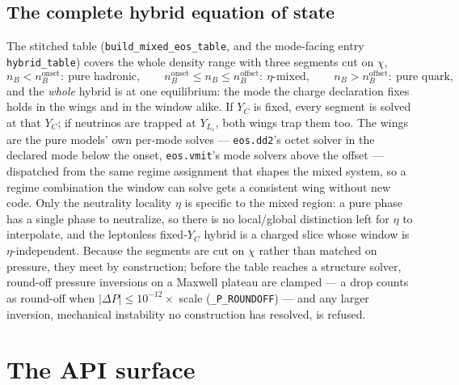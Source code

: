 \documentclass[aps,prc,onecolumn,superscriptaddress,nofootinbib,10pt]{revtex4-2}
\newcommand{\nB}{n_B}
\begin{document}
\subsection*{The complete hybrid equation of state}

The stitched table (\texttt{build\_mixed\_eos\_table}, and the mode-facing
entry \texttt{hybrid\_table}) covers the whole density range with three
segments cut on $\chi$,
%
\begin{equation}
\nB < \nB^{\mathrm{onset}} : \ \text{pure hadronic}, \qquad
\nB^{\mathrm{onset}} \le \nB \le \nB^{\mathrm{offset}} : \ \text{$\eta$-mixed},
\qquad
\nB > \nB^{\mathrm{offset}} : \ \text{pure quark},
\end{equation}
%
and the \emph{whole} hybrid is at one equilibrium: the mode the charge
declaration fixes holds in the wings and in the window alike. If $Y_C$ is
fixed, every segment is solved at that $Y_C$; if neutrinos are trapped at
$Y_{L_e}$, both wings trap them too. The wings are the pure models' own
per-mode solves --- \texttt{eos.dd2}'s octet solver in the declared mode
below the onset, \texttt{eos.vmit}'s mode solvers above the offset ---
dispatched from the same regime assignment that shapes the mixed system, so a
regime combination the window can solve gets a consistent wing without new
code. Only the neutrality locality $\eta$ is specific to the mixed region: a
pure phase has a single phase to neutralize, so there is no local/global
distinction left for $\eta$ to interpolate, and the leptonless fixed-$Y_C$
hybrid is a charged slice whose window is $\eta$-independent. Because the
segments are cut on $\chi$ rather than matched on pressure, they meet by
construction; before the table reaches a structure solver, round-off pressure
inversions on a Maxwell plateau are clamped --- a drop counts as round-off when
$|\Delta P| \le 10^{-12} \times$ scale (\texttt{\_P\_ROUNDOFF}) --- and any
larger inversion, mechanical instability no construction has resolved, is
refused.

\section{The API surface}
\label{sec:api}
\end{document}
